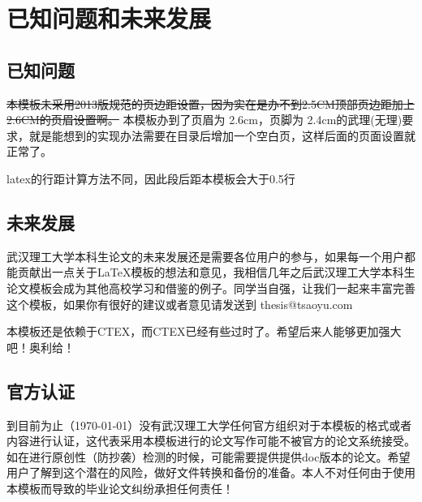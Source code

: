 \section{已知问题和未来发展}
\subsection{已知问题}
\sout{本模板未采用2013版规范的页边距设置，因为实在是办不到2.5CM顶部页边距加上2.6CM的页眉设置啊。}
本模板办到了页眉为 2.6cm，页脚为 2.4cm的武理(无理)要求，就是能想到的实现办法需要在目录后增加一个空白页，这样后面的页面设置就正常了。


latex的行距计算方法不同，因此段后距本模板会大于0.5行


\subsection{未来发展}
武汉理工大学本科生论文的未来发展还是需要各位用户的参与，如果每一个用户都能贡献出一点关于\LaTeX 模板的想法和意见，我相信几年之后武汉理工大学本科生论文模板会成为其他高校学习和借鉴的例子。同学当自强，让我们一起来丰富完善这个模板，如果你有很好的建议或者意见请发送到 thesis@tsaoyu.com


本模板还是依赖于CTEX，而CTEX已经有些过时了。希望后来人能够更加强大吧！奥利给！
\subsection{官方认证}
到目前为止（\today ）没有武汉理工大学任何官方组织对于本模板的格式或者内容进行认证，这代表采用本模板进行的论文写作可能不被官方的论文系统接受。如在进行原创性（防抄袭）检测的时候，可能需要提供提供doc版本的论文。希望用户了解到这个潜在的风险，做好文件转换和备份的准备。本人不对任何由于使用本模板而导致的毕业论文纠纷承担任何责任！
